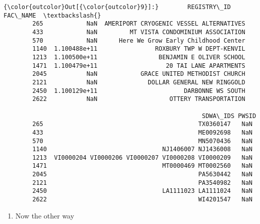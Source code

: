 \documentclass[11pt]{article}
\providecommand{\tightlist}{%
      \setlength{\itemsep}{0pt}\setlength{\parskip}{0pt}}
\begin{document}
\begin{Verbatim}[commandchars=\\\{\}]
{\color{outcolor}Out[{\color{outcolor}9}]:}        REGISTRY\_ID                                 FAC\_NAME  \textbackslash{}
        265            NaN  AMERIPORT CRYOGENIC VESSEL ALTERNATIVES   
        433            NaN         MT VISTA CONDOMINIUM ASSOCIATION   
        570            NaN      Here We Grow Early Childhood Center   
        1140  1.100488e+11                ROXBURY TWP W DEPT-KENVIL   
        1213  1.100500e+11                 BENJAMIN E OLIVER SCHOOL   
        1471  1.100479e+11                   20 TAI LANE APARTMENTS   
        2045           NaN            GRACE UNITED METHODIST CHURCH   
        2121           NaN              DOLLAR GENERAL NEW RINGGOLD   
        2450  1.100129e+11                        DARBONNE WS SOUTH   
        2622           NaN                    OTTERY TRANSPORTATION   
        
                                                       SDWA\_IDS PWSID  
        265                                           TX0360147   NaN  
        433                                           ME0092698   NaN  
        570                                           MN5070436   NaN  
        1140                                NJ1406007 NJ1436008   NaN  
        1213  VI0000204 VI0000206 VI0000207 VI0000208 VI0000209   NaN  
        1471                                MT0000469 MT0002560   NaN  
        2045                                          PA5630442   NaN  
        2121                                          PA3540982   NaN  
        2450                                LA1111023 LA1111024   NaN  
        2622                                          WI4201547   NaN  
\end{Verbatim}
            
    \begin{enumerate}
\def\labelenumi{\arabic{enumi}.}
\setcounter{enumi}{2}
\tightlist
\item
  Now the other way
\end{enumerate}
\end{document}
